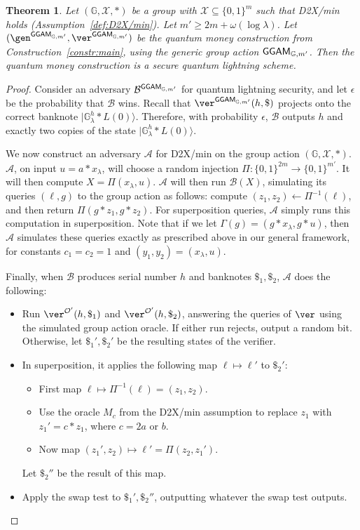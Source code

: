 \documentclass{article}\usepackage[a4paper,margin=20mm]{geometry}
\newtheorem{theorem}{Theorem}\newtheorem{lemma}[theorem]{Lemma}\newtheorem{proposition}[theorem]{Proposition}\newtheorem{corollary}[theorem]{Corollary}\newtheorem{definition}[theorem]{Definition}\newtheorem{claim}[theorem]{Claim}\newtheorem{remark}[theorem]{Remark}\newtheorem{observation}[theorem]{Observation}\newtheorem{conjecture}[theorem]{Conjecture}\newtheorem{example}[theorem]{Example}
\numberwithin{theorem}{section}
\numberwithin{equation}{section}
\newcommand{\G}{\mathbb{G}}
\newcommand{\As}{{\mathcal{A}}}
\newcommand{\Bs}{{\mathcal{B}}}
\newcommand{\Os}{{\mathcal{O}}}
\newcommand{\Xs}{{\mathcal{X}}}
\newcommand{\GGAM}{{\sf GGAM}}
\begin{document}
\begin{theorem}\label{thm:main} Let $(\G,\Xs,*)$ be a group with $\Xs\subseteq\{0,1\}^m$ such that D2X/min holds (Assumption~\ref{def:D2X/min}). Let $m'\geq 2m+\omega(\log\lambda)$. Let $(\gen^{\GGAM_{\G,m'}},\ver^{\GGAM_{\G,m'}})$ be the quantum money construction from Construction~\ref{constr:main}, using the generic group action $\GGAM_{\G,m'}$. Then the quantum money construction is a secure quantum lightning scheme.\end{theorem}
\begin{proof}Consider an adversary $\Bs^{\GGAM_{\G,m'}}$ for quantum lightning security, and let $\epsilon$ be the probability that $\Bs$ wins. Recall that $\ver^{\GGAM_{\G,m'}}(h,\$)$ projects onto the correct banknote $|\G^h_\lambda*L(0)\rangle$. Therefore, with probability $\epsilon$, $\Bs$ outputs $h$ and exactly two copies of the state $|\G^h_\lambda*L(0)\rangle$.
	
	We now construct an adversary $\As$ for D2X/min on the group action $(\G,\Xs,*)$. $\As$, on input $u=a*x_\lambda$, will choose a random injection $\Pi:\{0,1\}^{2m}\rightarrow\{0,1\}^{m'}$. It will then compute $X=\Pi(x_\lambda,u)$. $\As$ will then run $\Bs(X)$, simulating its queries $(\ell,g)$ to the group action as follows: compute $(z_1,z_2)\gets\Pi^{-1}(\ell)$, and then return $\Pi(g*z_1,g*z_2)$. For superposition queries, $\As$ simply runs this computation in superposition. Note that if we let $\Gamma(g)=(g*x_\lambda,g*u)$, then $\As$ simulates these queries exactly as prescribed above in our general framework, for constants $c_1=c_2=1$ and $(y_1,y_2)=(x_\lambda,u)$.
	
	Finally, when $\Bs$ produces serial number $h$ and banknotes $\$_1,\$_2$, $\As$ does the following:
	\begin{itemize}
		\item Run $\ver^{\Os'}(h,\$_1)$ and $\ver^{\Os'}(h,\$_2)$, answering the queries of $\ver$ using the simulated group action oracle. If either run rejects, output a random bit. Otherwise, let $\$_1',\$_2'$ be the resulting states of the verifier.
		\item In superposition, it applies the following map $\ell\mapsto\ell'$ to $\$_2'$:
		\begin{itemize}
			\item First map $\ell\mapsto\Pi^{-1}(\ell)=(z_1,z_2)$.
			\item Use the oracle $M_c$ from the D2X/min assumption to replace $z_1$ with $z_1'=c*z_1$, where $c=2a$ or $b$.
			\item Now map $(z_1',z_2)\mapsto\ell'=\Pi(z_2,z_1')$.
		\end{itemize}
		Let $\$_2''$ be the result of this map.
		\item Apply the swap test to $\$_1',\$_2''$, outputting whatever the swap test outputs.
	\end{itemize}
	

\end{proof}
\end{document}
